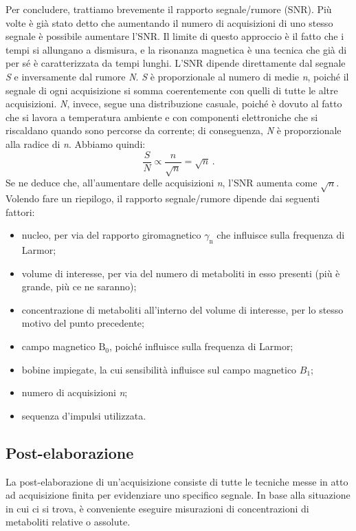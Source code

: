 \documentclass{report}
\numberwithin{equation}{section}
\numberwithin{figure}{section}
\begin{document}
\newpage

Per concludere, trattiamo brevemente il rapporto segnale/rumore (SNR). Più volte è già stato detto che aumentando il numero di acquisizioni di uno stesso segnale è possibile aumentare l'SNR. Il limite di questo approccio è il fatto che i tempi si allungano a dismisura, e la risonanza magnetica è una tecnica che già di per sé è caratterizzata da tempi lunghi. L'SNR dipende direttamente dal segnale \textit{S} e inversamente dal rumore \textit{N}. \textit{S} è proporzionale al numero di medie \textit{n}, poiché il segnale di ogni acquisizione si somma coerentemente con quelli di tutte le altre acquisizioni. \textit{N}, invece, segue una distribuzione casuale, poiché è dovuto al fatto che si lavora a temperatura ambiente e con componenti elettroniche che si riscaldano quando sono percorse da corrente; di conseguenza, \textit{N} è proporzionale alla radice di \textit{n}. Abbiamo quindi:
\begin{equation}
    \frac{S}{N} \propto \frac{n}{\sqrt{n}} = \sqrt{n}\,.
\end{equation}
Se ne deduce che, all'aumentare delle acquisizioni \textit{n}, l'SNR aumenta come $\sqrt n$.\\
Volendo fare un riepilogo, il rapporto segnale/rumore dipende dai seguenti fattori:
\begin{itemize}[label=$-$]
    \item nucleo, per via del rapporto giromagnetico $\gamma_\mathrm{n}$ che influisce sulla frequenza di Larmor;
    \item volume di interesse, per via del numero di metaboliti in esso presenti (più è grande, più ce ne saranno);
    \item concentrazione di metaboliti all'interno del volume di interesse, per lo stesso motivo del punto precedente;
    \item campo magnetico $\mathrm{B_0}$, poiché influisce sulla frequenza di Larmor;
    \item bobine impiegate, la cui sensibilità influisce sul campo magnetico $B_1$;
    \item numero di acquisizioni \textit{n};
    \item sequenza d'impulsi utilizzata.
\end{itemize}

\subsection{Post-elaborazione}
La post-elaborazione di un'acquisizione consiste di tutte le tecniche messe in atto ad acquisizione finita per evidenziare uno specifico segnale. In base alla situazione in cui ci si trova, è conveniente eseguire misurazioni di concentrazioni di metaboliti relative o assolute.
\end{document}

